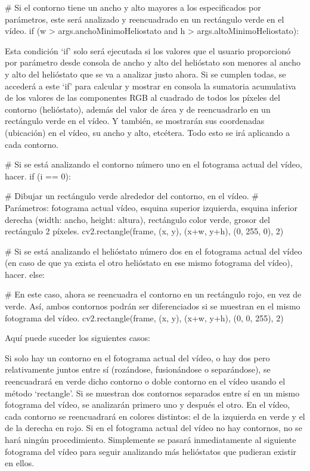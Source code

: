 \documentclass[12pt]{article}
\begin{document}
        \# Si el contorno tiene un ancho y alto mayores a los especificados por parámetros, este será analizado y reencuadrado en un rectángulo verde en el vídeo.
        if (w > args.anchoMinimoHeliostato and h > args.altoMinimoHeliostato):

Esta condición ‘if’ solo será ejecutada si los valores que el usuario proporcionó por parámetro desde consola de ancho y alto del helióstato son menores al ancho y alto del helióstato que se va a analizar justo ahora. Si se cumplen todas, se accederá a este ‘if’ para calcular y mostrar en consola la sumatoria acumulativa de los valores de las componentes RGB al cuadrado de todos los píxeles del contorno (helióstato), además del valor de área y de reencuadrarlo en un rectángulo verde en el vídeo. Y también, se mostrarán sus coordenadas (ubicación) en el vídeo, su ancho y alto, etcétera. Todo esto se irá aplicando a cada contorno.
            

            \# Si se está analizando el contorno número uno en el fotograma actual del vídeo, hacer.
            if (i == 0):

                \# Dibujar un rectángulo verde alrededor del contorno, en el vídeo.
                \# Parámetros: fotograma actual vídeo, esquina superior izquierda, esquina inferior derecha (width: ancho, height: altura), rectángulo color verde, grosor del rectángulo 2 píxeles.
                cv2.rectangle(frame, (x, y), (x+w, y+h), (0, 255, 0), 2)

            \# Si se está analizando el helióstato número dos en el fotograma actual del vídeo (en caso de que ya exista el otro helióstato en ese mismo fotograma del vídeo), hacer.
            else:

                \# En este caso, ahora se reencuadra el contorno en un rectángulo rojo, en vez de verde. Así, ambos contornos podrán ser diferenciados si se muestran en el mismo fotograma del vídeo.
                cv2.rectangle(frame, (x, y), (x+w, y+h), (0, 0, 255), 2)

Aquí puede suceder los siguientes casos:

Si solo hay un contorno en el fotograma actual del vídeo, o hay dos pero relativamente juntos entre sí (rozándose, fusionándose o separándose), se reencuadrará en verde dicho contorno o doble contorno en el vídeo usando el método ‘rectangle’.
Si se muestran dos contornos separados entre sí en un mismo fotograma del vídeo, se analizarán primero uno y después el otro. En el vídeo, cada contorno se reencuadrará en colores distintos: el de la izquierda en verde y el de la derecha en rojo.
Si en el fotograma actual del vídeo no hay contornos, no se hará ningún procedimiento. Simplemente se pasará inmediatamente al siguiente fotograma del vídeo para seguir analizando más helióstatos que pudieran existir en ellos.
\end{document}
